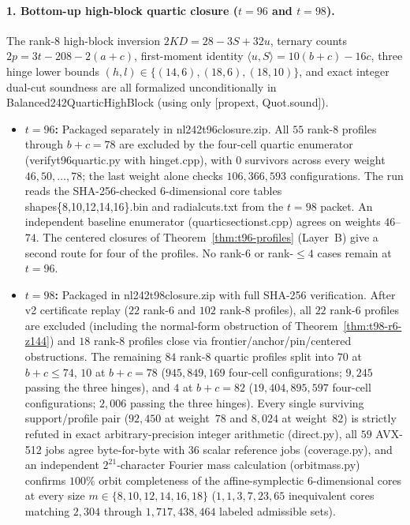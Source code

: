 \documentclass[11pt]{article}
\theoremstyle{definition}
\newcommand{\code}[1]{{\ttfamily\small\renewcommand{\_}{\textunderscore\allowbreak}#1}}
\begin{document}
\paragraph{1. Bottom-up high-block quartic closure ($t = 96$ and $t = 98$).}
The rank-$8$ high-block inversion $2KD = 28 - 3S + 32u$, ternary counts $2p = 3t - 208 - 2(a+c)$, first-moment identity $\langle u, S \rangle = 10(b+c) - 16c$, three hinge lower bounds $(h,l) \in \{(14,6),(18,6),(18,10)\}$, and exact integer dual-cut soundness are all formalized unconditionally in \code{Balanced242QuarticHighBlock} (using only \code{[propext, Quot.sound]}).
\begin{itemize}[nosep]
  \item \textbf{$t = 96$:} Packaged separately in \code{nl242\_t96\_closure.zip}. All $55$ rank-$8$ profiles through $b+c = 78$ are excluded by the four-cell quartic enumerator (\code{verify\_t96\_quartic.py} with \code{hinge\_t.cpp}), with $0$ survivors across every weight $46, 50, \dots, 78$; the last weight alone checks $106{,}366{,}593$ configurations. The run reads the SHA-256-checked $6$-dimensional core tables \code{shapes\{8,10,12,14,16\}.bin} and \code{radial\_cuts.txt} from the $t = 98$ packet. An independent baseline enumerator (\code{quartic\_sections\_t.cpp}) agrees on weights $46$--$74$. The centered closures of Theorem~\ref{thm:t96-profiles} (Layer~B) give a second route for four of the profiles. No rank-$6$ or rank-$\le 4$ cases remain at $t = 96$.
  \item \textbf{$t = 98$:} Packaged in \code{nl242\_t98\_closure.zip} with full SHA-256 verification. After v2 certificate replay ($22$ rank-$6$ and $102$ rank-$8$ profiles), all $22$ rank-$6$ profiles are excluded (including the normal-form obstruction of Theorem~\ref{thm:t98-r6-z144}) and $18$ rank-$8$ profiles close via frontier/anchor/pin/centered obstructions. The remaining $84$ rank-$8$ quartic profiles split into $70$ at $b+c \le 74$, $10$ at $b+c = 78$ ($945{,}849{,}169$ four-cell configurations; $9{,}245$ passing the three hinges), and $4$ at $b+c = 82$ ($19{,}404{,}895{,}597$ four-cell configurations; $2{,}006$ passing the three hinges). Every single surviving support/profile pair ($92{,}450$ at weight~$78$ and $8{,}024$ at weight~$82$) is strictly refuted in exact arbitrary-precision integer arithmetic (\code{direct.py}), all $59$ AVX-512 jobs agree byte-for-byte with $36$ scalar reference jobs (\code{coverage.py}), and an independent $2^{21}$-character Fourier mass calculation (\code{orbit\_mass.py}) confirms $100\%$ orbit completeness of the affine-symplectic $6$-dimensional cores at every size $m \in \{8, 10, 12, 14, 16, 18\}$ ($1, 1, 3, 7, 23, 65$ inequivalent cores matching $2{,}304$ through $1{,}717{,}438{,}464$ labeled admissible sets).
\end{itemize}
\end{document}

